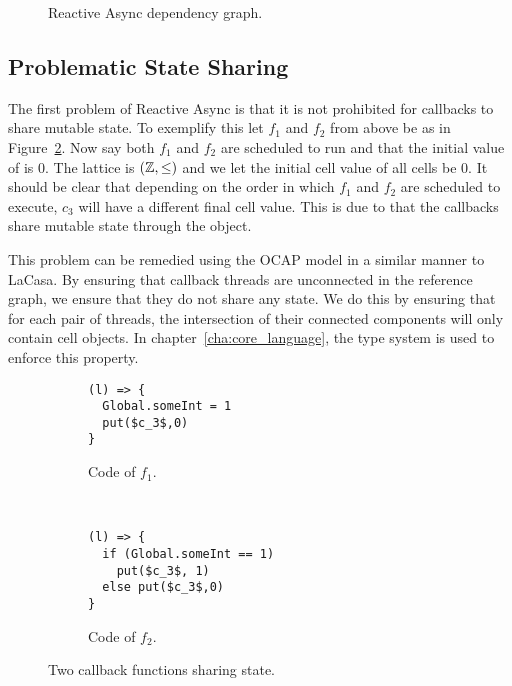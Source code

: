 \begin{figure}
  \centering
  \caption{Reactive Async dependency graph.}
  \label{fig:ra_example2}
\end{figure}

\subsection{Problematic State Sharing}%
\label{sub:sharing_state}

The first problem of Reactive Async is that it is not prohibited for callbacks
to share mutable state. To exemplify this let $f_1$ and $f_2$ from above be as
in Figure~\ref{fig:ra_fun_shared_state}. Now say both $f_1$ and $f_2$ are
scheduled to run and that the initial value of  is $0$.  The
lattice is $(\mathbb{Z}, \leq)$ and we let the initial cell value of all cells be
$0$.  It should be clear that depending on the order in which $f_1$ and $f_2$
are scheduled to execute, $c_3$ will have a different final cell value.  This is
due to that the callbacks share mutable state through the  object.

This problem can be remedied using the OCAP model in a similar manner to LaCasa.
By ensuring that callback threads are unconnected in the reference graph, we ensure
that they do not share any state. We do this by ensuring that for each pair of
threads, the intersection of their connected components will only contain cell
objects. In chapter~\ref{cha:core_language}, the type system is used to enforce
this property.

\begin{figure}
  \begin{subfigure}[b]{0.5\textwidth}
    \begin{lstlisting}
(l) => {
  Global.someInt = 1
  put($c_3$,0)
}
    \end{lstlisting}
    \caption{Code of $f_1$.}
  \end{subfigure}
  ~
  \begin{subfigure}[b]{0.5\textwidth}
    \begin{lstlisting}
(l) => {
  if (Global.someInt == 1)
    put($c_3$, 1)
  else put($c_3$,0)
}
    \end{lstlisting}
    \caption{Code of $f_2$.}
  \end{subfigure}
  \caption{Two callback functions sharing state.}
  \label{fig:ra_fun_shared_state}
\end{figure}


